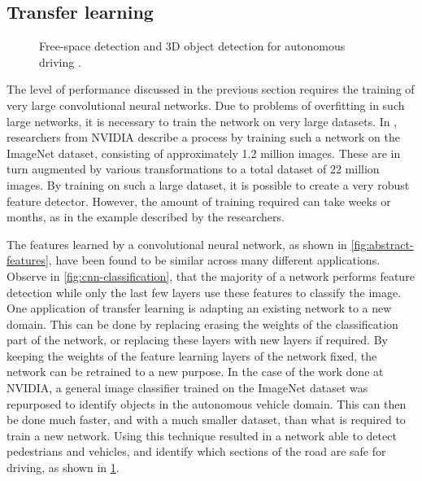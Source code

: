 \documentclass[\rootfolder/main.tex]{subfiles}
\begin{document}
\subsection{Transfer learning}

\begin{figure}
    \caption[Free-space detection and 3D object detection for autonomous driving.]{Free-space detection and 3D object detection for autonomous driving \cite{NVIDIA}.\label{fig:nvidia-cnn}}
\end{figure}

The level of performance discussed in the previous section requires the training of very large convolutional neural networks.
Due to problems of overfitting in such large networks, it is necessary to train the network on very large datasets.
In \cite{NVIDIA}, researchers from NVIDIA describe a process by training such a network on the ImageNet dataset, consisting of approximately 1.2 million images.
These are in turn augmented by various transformations to a total dataset of 22 million images.
By training on such a large dataset, it is possible to create a very robust feature detector.
However, the amount of training required can take weeks or months, as in the example described by the researchers.

The features learned by a convolutional neural network, as shown in \cref{fig:abstract-features}, have been found to be similar across many different applications.
Observe in \cref{fig:cnn-classification}, that the majority of a network performs feature detection while only the last few layers use these features to classify the image.
One application of transfer learning is adapting an existing network to a new domain.
This can be done by replacing erasing the weights of the classification part of the network, or replacing these layers with new layers if required.
By keeping the weights of the feature learning layers of the network fixed, the network can be retrained to a new purpose.
In the case of the work done at NVIDIA, a general image classifier trained on the ImageNet dataset was repurposed to identify objects in the autonomous vehicle domain.
This can then be done much faster, and with a much smaller dataset, than what is required to train a new network.
Using this technique resulted in a network able to detect pedestrians and vehicles, and identify which sections of the road are safe for driving, as shown in \cref{fig:nvidia-cnn}.

\end{document}
